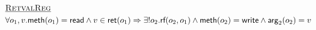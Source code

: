 \begin{align*}
  & \text{\underline{\sc RetvalReg}} \\
  & \forall o_1,v. {\sf meth}(o_1) = {\sf read} \land v\in {\sf ret}(o_1)
  \Rightarrow \exists! o_2. \textsf{rf}(o_2,o_1) \land {\sf meth}(o_2) = {\sf write}
  \land {\sf arg}_2(o_2)=v
\end{align*}

